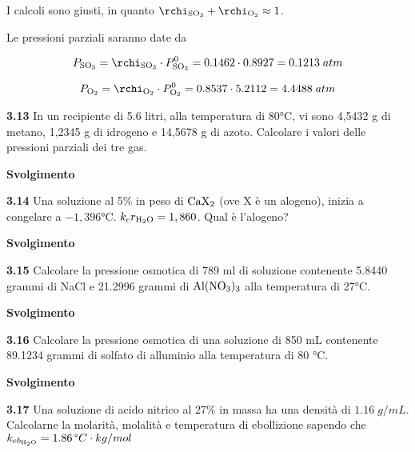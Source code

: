 I calcoli sono giusti, in quanto $\rchi_{\rm SO_3} + \rchi_{\rm O_2} \approx 1$.

Le pressioni parziali saranno date da

$$P_{\rm SO_3}=\rchi_{\rm SO_3} \cdot P^0_{\rm SO_3}
=0.1462 \cdot 0.8927=0.1213\;atm$$

$$P_{\rm O_2}=\rchi_{\rm O_2} \cdot P^0_{\rm O_2}
=0.8537 \cdot 5.2112=4.4488\;atm$$

\vspace{0.2cm}\textbf{3.13} In un recipiente di 5.6 litri, alla temperatura di 80°C, vi sono 4,5432 g di metano, 1,2345 g di idrogeno e 14,5678 g di azoto. Calcolare i valori delle pressioni parziali dei tre gas. 

\vspace{0.2cm}\large\textbf{Svolgimento}\normalsize

\vspace{0.2cm}

\vspace{0.2cm}\textbf{3.14} Una soluzione al 5\% in peso di $\rm CaX_2$ (ove X è un alogeno), inizia a congelare a $-1,396$°C. $k_cr_{\rm H_2O} = 1,860$. Qual è l'alogeno? 

\vspace{0.2cm}\large\textbf{Svolgimento}\normalsize

\vspace{0.2cm}

\vspace{0.2cm}\textbf{3.15} Calcolare la pressione osmotica di 789 ml di soluzione contenente 5.8440 grammi di NaCl e  21.2996 grammi di $\rm Al(NO_3)_3$ alla temperatura di 27°C.

\vspace{0.2cm}\large\textbf{Svolgimento}\normalsize

\vspace{0.2cm}

\vspace{0.2cm}\textbf{3.16} Calcolare la pressione osmotica di una soluzione di 850 mL contenente 89.1234 grammi di solfato di alluminio alla temperatura di 80 °C.

\vspace{0.2cm}\large\textbf{Svolgimento}\normalsize

\vspace{0.2cm}

\vspace{0.2cm}\textbf{3.17} Una soluzione di acido nitrico al 27\% in massa ha una densità di $1.16\;g/mL$. Calcolarne la molarità, molalità e temperatura di ebollizione sapendo che $k_{eb_{\rm H_2O}}=1.86\,\text{°}C \cdot kg/mol$

